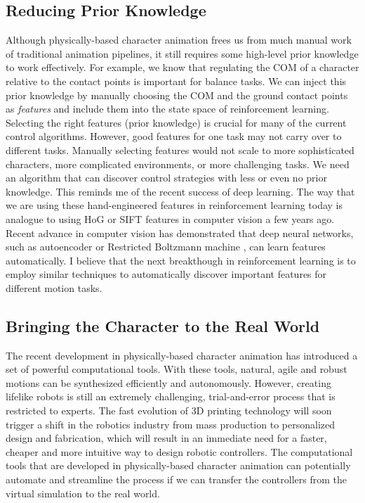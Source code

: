 \subsection{Reducing Prior Knowledge}

Although physically-based character animation frees us from much manual work of traditional animation pipelines, it still requires some high-level prior knowledge to work effectively. For example, we know that regulating the COM of a character relative to the contact points is important for balance tasks. We can inject this prior knowledge by manually choosing the COM and the ground contact points as \emph{features} and include them into the state space of reinforcement learning. Selecting the right features (prior knowledge) is crucial for many of the current control algorithms. However, good features for one task may not carry over to different tasks. Manually selecting features would not scale to more sophisticated characters, more complicated environments, or more challenging tasks. We need an algorithm that can discover control strategies with less or even no prior knowledge. This reminds me of the recent success of deep learning. The way that we are using these hand-engineered features in reinforcement learning today is analogue to using HoG or SIFT features in computer vision a few years ago. Recent advance in computer vision has demonstrated that deep neural networks, such as autoencoder \cite{Vincent:2008} or Restricted Boltzmann machine \cite{Hinton:2012}, can learn features automatically. I believe that the next breakthough in reinforcement learning is to employ similar techniques to automatically discover important features for different motion tasks.

\subsection{Bringing the Character to the Real World}

The recent development in physically-based character animation has introduced a set of powerful computational tools. With these tools, natural, agile and robust motions can be synthesized efficiently and autonomously. However, creating lifelike robots is still an extremely challenging, trial-and-error process that is restricted to experts. The fast evolution of 3D printing technology will soon trigger a shift in the robotics industry from mass production to personalized design and fabrication, which will result in an immediate need for a faster, cheaper and more intuitive way to design robotic controllers. The computational tools that are developed in physically-based character animation can potentially automate and streamline the process if we can transfer the controllers from the virtual simulation to the real world. 

